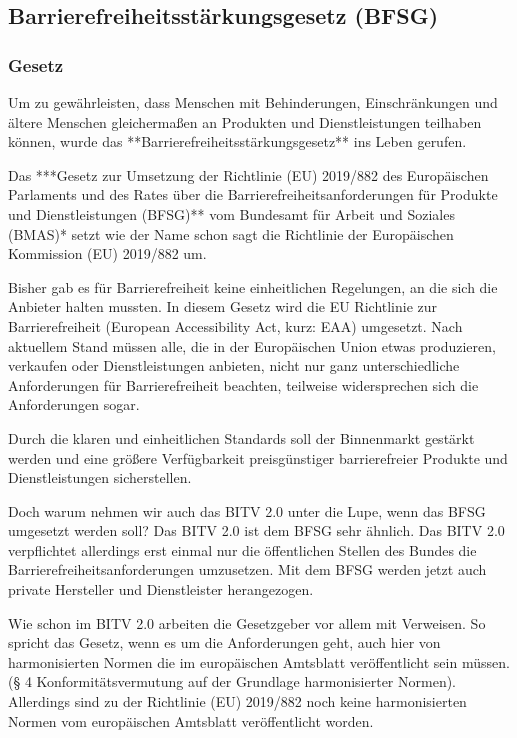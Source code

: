 \subsection{Barrierefreiheitsstärkungsgesetz (BFSG)}
\subsubsection{Gesetz}
Um zu gewährleisten, dass Menschen mit Behinderungen, Einschränkungen und ältere Menschen gleichermaßen an Produkten und Dienstleistungen teilhaben können, wurde das **Barrierefreiheitsstärkungsgesetz** ins Leben gerufen.

Das ***Gesetz zur Umsetzung der Richtlinie (EU) 2019/882 des Europäischen Parlaments und des Rates über die Barrierefreiheits­anforderungen für Produkte und Dienstleistungen (BFSG)** vom Bundesamt für Arbeit und Soziales (BMAS)* setzt wie der Name schon sagt die Richtlinie der Europäischen Kommission (EU) 2019/882 um.

Bisher gab es für Barrierefreiheit keine einheitlichen Regelungen, an die sich die Anbieter halten mussten. In diesem Gesetz wird die EU Richtlinie zur Barrierefreiheit (European Accessibility Act, kurz: EAA) umgesetzt. Nach aktuellem Stand müssen alle, die in der Europäischen Union etwas produzieren, verkaufen oder Dienstleistungen anbieten, nicht nur ganz unterschiedliche Anforderungen für Barrierefreiheit beachten, teilweise widersprechen sich die Anforderungen sogar. 

Durch die klaren und einheitlichen Standards soll der Binnenmarkt gestärkt werden und eine größere Verfügbarkeit preisgünstiger barrierefreier Produkte und Dienstleistungen sicherstellen.

Doch warum nehmen wir auch das BITV 2.0 unter die Lupe, wenn das BFSG umgesetzt werden soll? Das BITV 2.0 ist dem BFSG sehr ähnlich. Das BITV 2.0 verpflichtet allerdings erst einmal nur die öffentlichen Stellen des Bundes die Barrierefreiheitsanforderungen umzusetzen. Mit dem BFSG werden jetzt auch private Hersteller und Dienstleister herangezogen. 

Wie schon im BITV 2.0 arbeiten die Gesetzgeber vor allem mit Verweisen. So spricht das Gesetz, wenn es um die Anforderungen geht, auch hier von harmonisierten Normen die im europäischen Amtsblatt veröffentlicht sein müssen. (§ 4 Konformitätsvermutung auf der Grundlage harmonisierter Normen). Allerdings sind zu der Richtlinie (EU) 2019/882 noch keine harmonisierten Normen vom europäischen Amtsblatt veröffentlicht worden.

